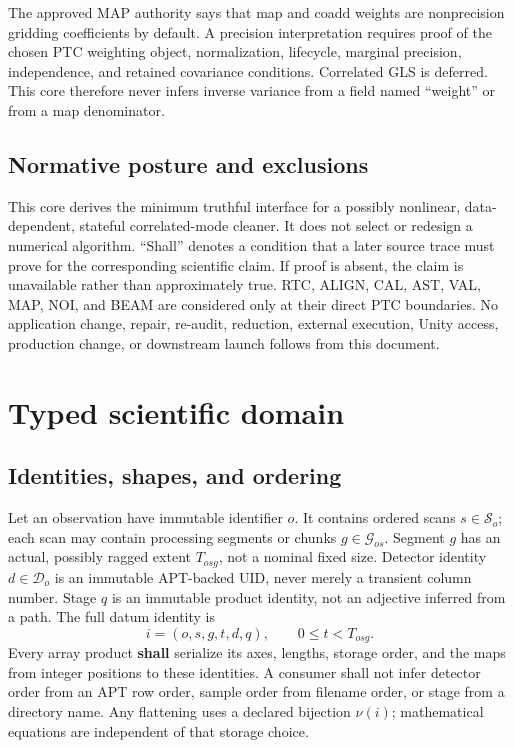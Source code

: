 \documentclass[11pt]{article}
\newcommand{\req}{\textbf{shall}}
\begin{document}
The approved MAP authority says that map and coadd weights are nonprecision
gridding coefficients by default.  A precision interpretation requires proof
of the chosen PTC weighting object, normalization, lifecycle, marginal
precision, independence, and retained covariance conditions.  Correlated GLS
is deferred.  This core therefore never infers inverse variance from a field
named ``weight'' or from a map denominator.

\subsection{Normative posture and exclusions}

This core derives the minimum truthful interface for a possibly nonlinear,
data-dependent, stateful correlated-mode cleaner.  It does not select or
redesign a numerical algorithm.  ``Shall'' denotes a condition that a later
source trace must prove for the corresponding scientific claim.  If proof is
absent, the claim is unavailable rather than approximately true.  RTC, ALIGN,
CAL, AST, VAL, MAP, NOI, and BEAM are considered only at their direct PTC
boundaries.  No application change, repair, re-audit, reduction, external
execution, Unity access, production change, or downstream launch follows from
this document.

\section{Typed scientific domain}
\label{sec:domain}

\subsection{Identities, shapes, and ordering}

Let an observation have immutable identifier $o$.  It contains ordered scans
$s\in\mathcal S_o$; each scan may contain processing segments or chunks
$g\in\mathcal G_{os}$.  Segment $g$ has an actual, possibly ragged extent
$T_{osg}$, not a nominal fixed size.  Detector identity $d\in\mathcal D_o$ is
an immutable APT-backed UID, never merely a transient column number.  Stage
$q$ is an immutable product identity, not an adjective inferred from a path.
The full datum identity is
\begin{equation}
  i=(o,s,g,t,d,q),\qquad 0\leq t<T_{osg}.
  \label{eq:datum-id}
\end{equation}
Every array product \req{} serialize its axes, lengths, storage order, and the
maps from integer positions to these identities.  A consumer shall not infer
detector order from an APT row order, sample order from filename order, or
stage from a directory name.  Any flattening uses a declared bijection
$\nu(i)$; mathematical equations are independent of that storage choice.
\end{document}
